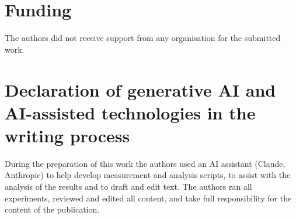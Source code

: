 \documentclass[preprint,12pt]{elsarticle}
\begin{document}
\section*{Funding}
The authors did not receive support from any organisation for the submitted work.

\section*{Declaration of generative AI and AI-assisted technologies in the writing process}
During the preparation of this work the authors used an AI assistant (Claude, Anthropic) to help develop measurement and analysis scripts, to assist with the analysis of the results and to draft and edit text. The authors ran all experiments, reviewed and edited all content, and take full responsibility for the content of the publication.



\end{document}

